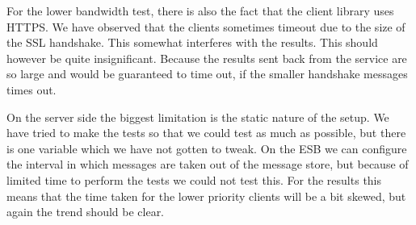 	For the lower bandwidth test, there is also the fact that the client library uses HTTPS. We have observed that the clients sometimes timeout due to the size of the SSL handshake. This somewhat interferes with the results. This should however be quite insignificant. Because the results sent back from the service are so large and would be guaranteed to time out, if the smaller handshake messages times out.
	
	On the server side the biggest limitation is the static nature of the setup. We have tried to make the tests so that we could test as much as possible, but there is one variable which we have not gotten to tweak. On the ESB we can configure the interval in which messages are taken out of the message store, but because of limited time to perform the tests we could not test this. For the results this means that the time taken for the lower priority clients will be a bit skewed, but again the trend should be clear.
